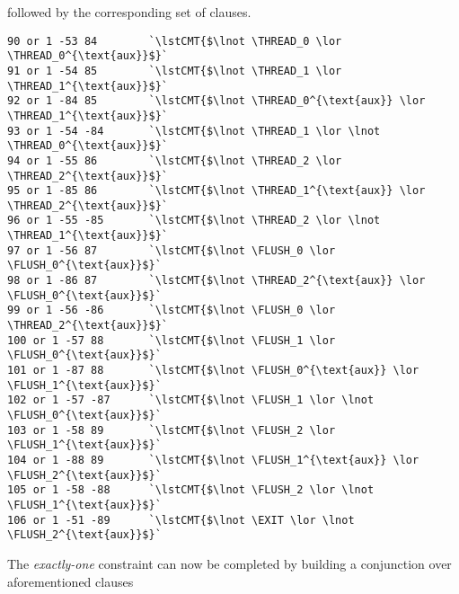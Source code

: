 followed by the corresponding set of clauses.
\begin{lstlisting}[style=btor2]
90 or 1 -53 84        `\lstCMT{$\lnot \THREAD_0 \lor \THREAD_0^{\text{aux}}$}`
91 or 1 -54 85        `\lstCMT{$\lnot \THREAD_1 \lor \THREAD_1^{\text{aux}}$}`
92 or 1 -84 85        `\lstCMT{$\lnot \THREAD_0^{\text{aux}} \lor \THREAD_1^{\text{aux}}$}`
93 or 1 -54 -84       `\lstCMT{$\lnot \THREAD_1 \lor \lnot \THREAD_0^{\text{aux}}$}`
94 or 1 -55 86        `\lstCMT{$\lnot \THREAD_2 \lor \THREAD_2^{\text{aux}}$}`
95 or 1 -85 86        `\lstCMT{$\lnot \THREAD_1^{\text{aux}} \lor \THREAD_2^{\text{aux}}$}`
96 or 1 -55 -85       `\lstCMT{$\lnot \THREAD_2 \lor \lnot \THREAD_1^{\text{aux}}$}`
97 or 1 -56 87        `\lstCMT{$\lnot \FLUSH_0 \lor \FLUSH_0^{\text{aux}}$}`
98 or 1 -86 87        `\lstCMT{$\lnot \THREAD_2^{\text{aux}} \lor \FLUSH_0^{\text{aux}}$}`
99 or 1 -56 -86       `\lstCMT{$\lnot \FLUSH_0 \lor \THREAD_2^{\text{aux}}$}`
100 or 1 -57 88       `\lstCMT{$\lnot \FLUSH_1 \lor \FLUSH_0^{\text{aux}}$}`
101 or 1 -87 88       `\lstCMT{$\lnot \FLUSH_0^{\text{aux}} \lor \FLUSH_1^{\text{aux}}$}`
102 or 1 -57 -87      `\lstCMT{$\lnot \FLUSH_1 \lor \lnot \FLUSH_0^{\text{aux}}$}`
103 or 1 -58 89       `\lstCMT{$\lnot \FLUSH_2 \lor \FLUSH_1^{\text{aux}}$}`
104 or 1 -88 89       `\lstCMT{$\lnot \FLUSH_1^{\text{aux}} \lor \FLUSH_2^{\text{aux}}$}`
105 or 1 -58 -88      `\lstCMT{$\lnot \FLUSH_2 \lor \lnot \FLUSH_1^{\text{aux}}$}`
106 or 1 -51 -89      `\lstCMT{$\lnot \EXIT \lor \lnot \FLUSH_2^{\text{aux}}$}`
\end{lstlisting}
The \emph{exactly-one} constraint can now be completed by building a conjunction over aforementioned clauses
